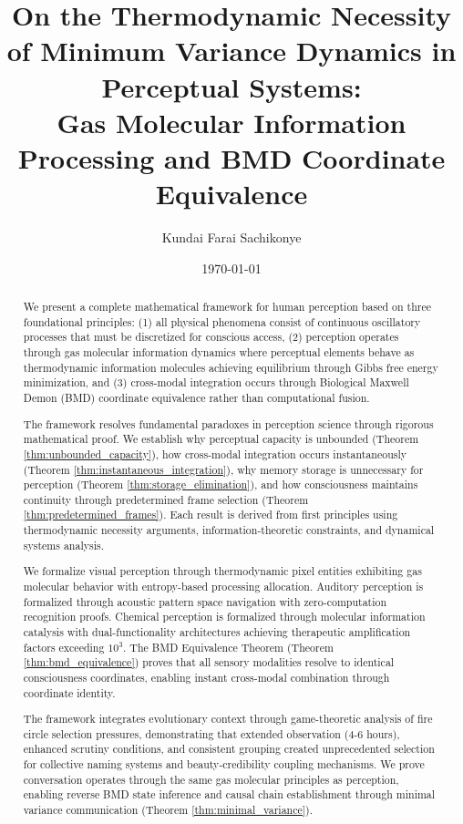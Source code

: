 \documentclass[12pt]{article}
\title{On the Thermodynamic Necessity of Minimum Variance Dynamics in Perceptual Systems: \\ Gas Molecular Information Processing and BMD Coordinate Equivalence}
\author{Kundai Farai Sachikonye}
\date{\today}
\theoremstyle{definition}
\theoremstyle{remark}
\begin{document}
\maketitle

\begin{abstract}
We present a complete mathematical framework for human perception based on three foundational principles: (1) all physical phenomena consist of continuous oscillatory processes that must be discretized for conscious access, (2) perception operates through gas molecular information dynamics where perceptual elements behave as thermodynamic information molecules achieving equilibrium through Gibbs free energy minimization, and (3) cross-modal integration occurs through Biological Maxwell Demon (BMD) coordinate equivalence rather than computational fusion. 

The framework resolves fundamental paradoxes in perception science through rigorous mathematical proof. We establish why perceptual capacity is unbounded (Theorem \ref{thm:unbounded_capacity}), how cross-modal integration occurs instantaneously (Theorem \ref{thm:instantaneous_integration}), why memory storage is unnecessary for perception (Theorem \ref{thm:storage_elimination}), and how consciousness maintains continuity through predetermined frame selection (Theorem \ref{thm:predetermined_frames}). Each result is derived from first principles using thermodynamic necessity arguments, information-theoretic constraints, and dynamical systems analysis.

We formalize visual perception through thermodynamic pixel entities exhibiting gas molecular behavior with entropy-based processing allocation. Auditory perception is formalized through acoustic pattern space navigation with zero-computation recognition proofs. Chemical perception is formalized through molecular information catalysis with dual-functionality architectures achieving therapeutic amplification factors exceeding $10^3$. The BMD Equivalence Theorem (Theorem \ref{thm:bmd_equivalence}) proves that all sensory modalities resolve to identical consciousness coordinates, enabling instant cross-modal combination through coordinate identity.

The framework integrates evolutionary context through game-theoretic analysis of fire circle selection pressures, demonstrating that extended observation (4-6 hours), enhanced scrutiny conditions, and consistent grouping created unprecedented selection for collective naming systems and beauty-credibility coupling mechanisms. We prove conversation operates through the same gas molecular principles as perception, enabling reverse BMD state inference and causal chain establishment through minimal variance communication (Theorem \ref{thm:minimal_variance}).


\end{abstract}
\end{document}
